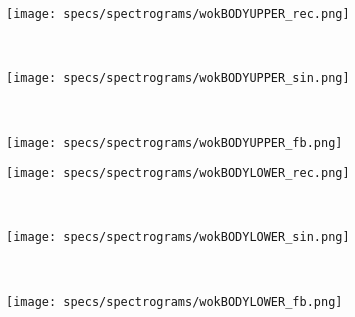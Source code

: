 \begin{figure}[H]
    \centering
    \begin{subfigure}[b]{0.25\textwidth}
        \texttt{[image: specs/spectrograms/wokBODYUPPER\_rec.png]}
    \end{subfigure}%
    ~ %
    \begin{subfigure}[b]{0.25\textwidth}
        \texttt{[image: specs/spectrograms/wokBODYUPPER\_sin.png]}
    \end{subfigure}%
    ~ %
    \begin{subfigure}[b]{0.25\textwidth}
        \texttt{[image: specs/spectrograms/wokBODYUPPER\_fb.png]}
    \end{subfigure}%
      
    \begin{subfigure}[b]{0.25\textwidth}
        \texttt{[image: specs/spectrograms/wokBODYLOWER\_rec.png]}
    \end{subfigure}%
    ~ %
    \begin{subfigure}[b]{0.25\textwidth}
        \texttt{[image: specs/spectrograms/wokBODYLOWER\_sin.png]}
    \end{subfigure}%
    ~ %
    \begin{subfigure}[b]{0.25\textwidth}
        \texttt{[image: specs/spectrograms/wokBODYLOWER\_fb.png]}
    \end{subfigure}%


\end{figure}
